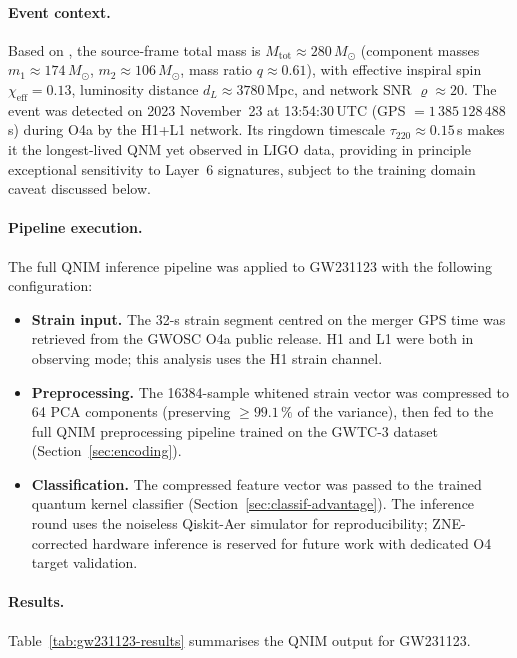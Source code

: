 \documentclass[11pt,a4paper, english]{book}
\theoremstyle{plain}
\theoremstyle{definition}
\numberwithin{equation}{chapter}
\numberwithin{figure}{chapter}
\numberwithin{table}{chapter}
\begin{document}
\paragraph{Event context.}
Based on , the source-frame total mass is
$M_\mathrm{tot} \approx 280\,M_\odot$ (component masses
$m_1 \approx 174\,M_\odot$, $m_2 \approx 106\,M_\odot$, mass ratio
$q \approx 0.61$), with effective inspiral spin $\chi_\mathrm{eff} = 0.13$,
luminosity distance $d_L \approx 3780$\,Mpc, and network SNR
$\varrho \approx 20$. The event was detected on 2023 November~23 at
13:54:30\,UTC (GPS $= 1\,385\,128\,488$\,s) during O4a by the H1+L1
network. Its ringdown timescale $\tau_{220} \approx 0.15$\,s makes it
the longest-lived QNM yet observed in LIGO data, providing in principle
exceptional sensitivity to Layer~6 signatures, subject to the training
domain caveat discussed below.

\paragraph{Pipeline execution.}
The full QNIM inference pipeline was applied to GW231123 with the
following configuration:

\begin{itemize}
  \item \textbf{Strain input.}
        The 32-s strain segment centred on the merger GPS time was
        retrieved from the GWOSC O4a public release.
        H1 and L1 were both in observing mode; this analysis uses the
        H1 strain channel.

  \item \textbf{Preprocessing.}
        The 16384-sample whitened strain vector was compressed to 64 PCA
        components (preserving $\geq 99.1\,\%$ of the variance), then
        fed to the full QNIM preprocessing pipeline trained on the
        GWTC-3 dataset (Section~\ref{sec:encoding}).

  \item \textbf{Classification.}
        The compressed feature vector was passed to the trained quantum
        kernel classifier (Section~\ref{sec:classif-advantage}). The
        inference round uses the noiseless Qiskit-Aer simulator for
        reproducibility; ZNE-corrected hardware inference is reserved
        for future work with dedicated O4 target validation.
\end{itemize}

\paragraph{Results.}
Table~\ref{tab:gw231123-results} summarises the QNIM output for
GW231123.
\end{document}
